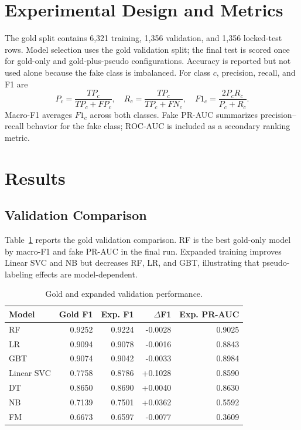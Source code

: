 \documentclass[conference]{IEEEtran}
\begin{document}
\section{Experimental Design and Metrics}
The gold split contains 6,321 training, 1,356 validation, and 1,356 locked-test rows. Model selection uses the gold validation split; the final test is scored once for gold-only and gold-plus-pseudo configurations. Accuracy is reported but not used alone because the fake class is imbalanced. For class $c$, precision, recall, and F1 are
\begin{equation}
P_c=\frac{TP_c}{TP_c+FP_c},\quad R_c=\frac{TP_c}{TP_c+FN_c},\quad F1_c=\frac{2P_cR_c}{P_c+R_c}.
\label{eq:metrics}
\end{equation}
Macro-F1 averages $F1_c$ across both classes. Fake PR-AUC summarizes precision--recall behavior for the fake class; ROC-AUC is included as a secondary ranking metric.

\section{Results}
\subsection{Validation Comparison}
Table~\ref{tab:val} reports the gold validation comparison. RF is the best gold-only model by macro-F1 and fake PR-AUC in the final run. Expanded training improves Linear SVC and NB but decreases RF, LR, and GBT, illustrating that pseudo-labeling effects are model-dependent.

\begin{table}[t]
\caption{Gold and expanded validation performance.}
\label{tab:val}
\centering\scriptsize
\begin{tabular}{lrrrr}
\toprule
Model & Gold F1 & Exp. F1 & $\Delta$F1 & Exp. PR-AUC\\
\midrule
RF & 0.9252 & 0.9224 & -0.0028 & 0.9025\\
LR & 0.9094 & 0.9078 & -0.0016 & 0.8843\\
GBT & 0.9074 & 0.9042 & -0.0033 & 0.8984\\
Linear SVC & 0.7758 & 0.8786 & +0.1028 & 0.8590\\
DT & 0.8650 & 0.8690 & +0.0040 & 0.8630\\
NB & 0.7139 & 0.7501 & +0.0362 & 0.5592\\
FM & 0.6673 & 0.6597 & -0.0077 & 0.3609\\
\bottomrule
\end{tabular}
\end{table}
\end{document}
